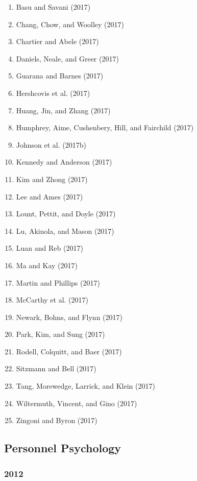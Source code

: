 \documentclass[english,man]{apa6}
\providecommand{\tightlist}{%
  \setlength{\itemsep}{0pt}\setlength{\parskip}{0pt}}
\begin{document}
\begin{enumerate}
\def\labelenumi{\arabic{enumi})}
\tightlist
\item
  Basu and Savani (2017)
\item
  Chang, Chow, and Woolley (2017)
\item
  Chartier and Abele (2017)
\item
  Daniels, Neale, and Greer (2017)
\item
  Guarana and Barnes (2017)
\item
  Hershcovis et al. (2017)
\item
  Huang, Jin, and Zhang (2017)
\item
  Humphrey, Aime, Cushenbery, Hill, and Fairchild (2017)
\item
  Johnson et al. (2017b)
\item
  Kennedy and Anderson (2017)
\item
  Kim and Zhong (2017)
\item
  Lee and Ames (2017)
\item
  Lount, Pettit, and Doyle (2017)
\item
  Lu, Akinola, and Mason (2017)
\item
  Luan and Reb (2017)
\item
  Ma and Kay (2017)
\item
  Martin and Phillips (2017)
\item
  McCarthy et al. (2017)
\item
  Newark, Bohns, and Flynn (2017)
\item
  Park, Kim, and Sung (2017)
\item
  Rodell, Colquitt, and Baer (2017)
\item
  Sitzmann and Bell (2017)
\item
  Tang, Morewedge, Larrick, and Klein (2017)
\item
  Wiltermuth, Vincent, and Gino (2017)
\item
  Zingoni and Byron (2017)
\end{enumerate}

\subsection{Personnel Psychology}\label{personnel-psychology}

\subsubsection{2012}\label{section-30}
\end{document}
